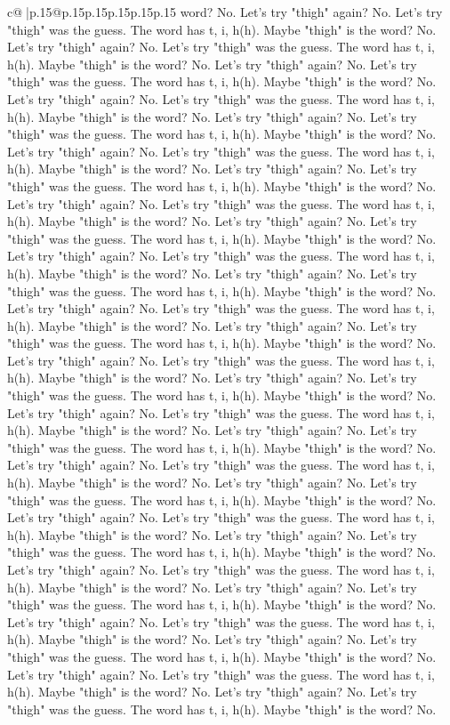 \documentclass{article}
\begin{document}
{\begin{supertabular}{c@{$\;$}|p{.15\linewidth}@{}p{.15\linewidth}p{.15\linewidth}p{.15\linewidth}p{.15\linewidth}p{.15\linewidth}}
{{{word? No. Let's try "thigh" again? No. Let's try "thigh" was the guess. The word has t, i, h(h). Maybe "thigh" is the word? No. Let's try "thigh" again? No. Let's try "thigh" was the guess. The word has t, i, h(h). Maybe "thigh" is the word? No. Let's try "thigh" again? No. Let's try "thigh" was the guess. The word has t, i, h(h). Maybe "thigh" is the word? No. Let's try "thigh" again? No. Let's try "thigh" was the guess. The word has t, i, h(h). Maybe "thigh" is the word? No. Let's try "thigh" again? No. Let's try "thigh" was the guess. The word has t, i, h(h). Maybe "thigh" is the word? No. Let's try "thigh" again? No. Let's try "thigh" was the guess. The word has t, i, h(h). Maybe "thigh" is the word? No. Let's try "thigh" again? No. Let's try "thigh" was the guess. The word has t, i, h(h). Maybe "thigh" is the word? No. Let's try "thigh" again? No. Let's try "thigh" was the guess. The word has t, i, h(h). Maybe "thigh" is the word? No. Let's try "thigh" again? No. Let's try "thigh" was the guess. The word has t, i, h(h). Maybe "thigh" is the word? No. Let's try "thigh" again? No. Let's try "thigh" was the guess. The word has t, i, h(h). Maybe "thigh" is the word? No. Let's try "thigh" again? No. Let's try "thigh" was the guess. The word has t, i, h(h). Maybe "thigh" is the word? No. Let's try "thigh" again? No. Let's try "thigh" was the guess. The word has t, i, h(h). Maybe "thigh" is the word? No. Let's try "thigh" again? No. Let's try "thigh" was the guess. The word has t, i, h(h). Maybe "thigh" is the word? No. Let's try "thigh" again? No. Let's try "thigh" was the guess. The word has t, i, h(h). Maybe "thigh" is the word? No. Let's try "thigh" again? No. Let's try "thigh" was the guess. The word has t, i, h(h). Maybe "thigh" is the word? No. Let's try "thigh" again? No. Let's try "thigh" was the guess. The word has t, i, h(h). Maybe "thigh" is the word? No. Let's try "thigh" again? No. Let's try "thigh" was the guess. The word has t, i, h(h). Maybe "thigh" is the word? No. Let's try "thigh" again? No. Let's try "thigh" was the guess. The word has t, i, h(h). Maybe "thigh" is the word? No. Let's try "thigh" again? No. Let's try "thigh" was the guess. The word has t, i, h(h). Maybe "thigh" is the word? No. Let's try "thigh" again? No. Let's try "thigh" was the guess. The word has t, i, h(h). Maybe "thigh" is the word? No. Let's try "thigh" again? No. Let's try "thigh" was the guess. The word has t, i, h(h). Maybe "thigh" is the word? No. Let's try "thigh" again? No. Let's try "thigh" was the guess. The word has t, i, h(h). Maybe "thigh" is the word? No. Let's try "thigh" again? No. Let's try "thigh" was the guess. The word has t, i, h(h). Maybe "thigh" is the word? No. Let's try "thigh" again? No. Let's try "thigh" was the guess. The word has t, i, h(h). Maybe "thigh" is the word? No. Let's try "thigh" again? No. Let's try "thigh" was the guess. The word has t, i, h(h). Maybe "thigh" is the word? No. Let's try "thigh" again? No. Let's try "thigh" was the guess. The word has t, i, h(h). Maybe "thigh" is the word? No. Let's try "thigh" again? No. Let's try "thigh" was the guess. The word has t, i, h(h). Maybe "thigh" is the word? No. }}}
\end{supertabular}}
\end{document}
